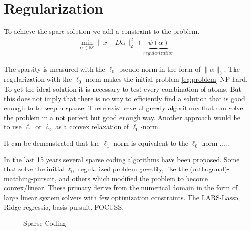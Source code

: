 \section{Regularization}
To achieve the spare solution we add a constraint to the problem. 
\begin{align}
\min_{\alpha\in\mathbb{R}^{p}} \lVert x - D\alpha \rVert^{2}_{2} + \underbrace{\psi(\alpha)}_{regularization}
\end{align}

The sparsity is measured with the $\ell_0$ pseudo-norm in the form of $\lVert\alpha\rVert_{0}$.
The regularization with the $\ell_0$-norm makes the initial problem \ref{eq:problem} NP-hard.
To get the ideal solution it is necessary to test every combination of atoms.
But this does not imply that there is no way to efficiently find a solution that is good enough to
to keep $\alpha$ sparse. There exist several greedy algorithms that can solve the problem in a not perfect but
good enough way. Another approach would be to use $\ell_1$ or $\ell_2$ as a convex relaxation of $\ell_0$-norm.

It can be demonstrated that the $\ell_1$-norm is equivalent to the $\ell_0$-norm .....

In the last 15 years several sparse coding algorithms have been proposed. 
Some that solve the initial $\ell_0$ regularized problem greedily, like the (orthogonal)-matching-pursuit,
and others which modified the problem to become convex/linear. These primary derive from the numerical domain in the form of 
large linear system solvers with few optimization constraints. The LARS-Lasso, Ridge regressio, basis pursuit, FOCUSS.



\begin{figure}
\centering
\caption{Sparse Coding}
\label{fig:da_x}
\end{figure}






